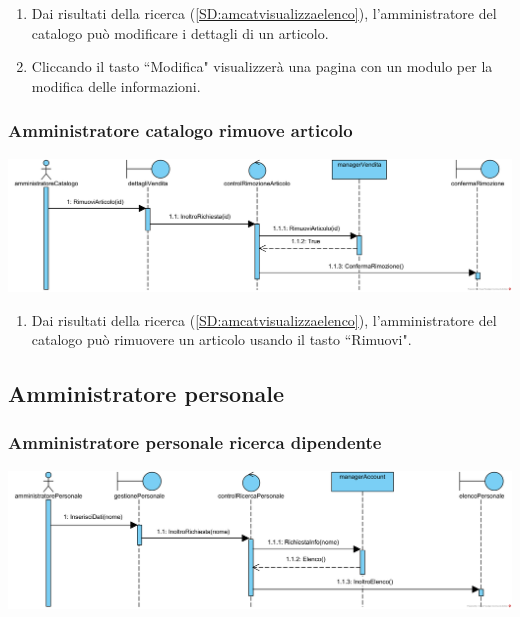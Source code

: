 \documentclass[12pt]{article}
\begin{document}
\begin{enumerate}
\item Dai risultati della ricerca (\ref{SD:amcatvisualizzaelenco}), l'amministratore del catalogo può modificare i dettagli di un articolo.
\item Cliccando il tasto ``Modifica" visualizzerà una pagina con un modulo per la modifica delle informazioni.
\end{enumerate}

\subsubsection{Amministratore catalogo rimuove articolo}
\label{SD:amcatrimuovearticolo}
\begin{center}
\includegraphics[width=\textwidth]{SequenceDiagram/AmministratoreCatalogoVenditaRimuove}
\end{center}

\begin{enumerate}
\item Dai risultati della ricerca (\ref{SD:amcatvisualizzaelenco}), l'amministratore del catalogo può rimuovere un articolo usando il tasto ``Rimuovi".
\end{enumerate}

\newpage

\subsection{Amministratore personale}
\subsubsection{Amministratore personale ricerca dipendente}
\label{SD:amperricerca}
\begin{center}
\includegraphics[width=\textwidth]{SequenceDiagram/AmministratorePersonaleDipendenteRicerca}
\end{center}
\end{document}
